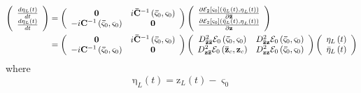 \documentclass[aps,preprint]{revtex4}%
\begin{document}
\begin{align}
\left(
\begin{array}
[c]{c}%
\frac{d\mathrm{\eta}_{L}\left(  t\right)  }{dt}\\
\frac{d\mathrm{\eta}_{L}\left(  t\right)  }{dt}%
\end{array}
\right)   &  =\left(
\begin{array}
[c]{cc}%
\mathbf{0} & i\mathbf{\bar{C}}^{-1}\left(  \mathbf{\bar{\varsigma}}%
_{0},\mathbf{\varsigma}_{0}\right) \\
-i\mathbf{C}^{-1}\left(  \mathbf{\bar{\varsigma}}_{0},\mathbf{\varsigma}%
_{0}\right)  & \mathbf{0}%
\end{array}
\right)  \left(
\begin{array}
[c]{c}%
\frac{\partial\mathcal{E}_{2}\left[  \mathbf{\varsigma}_{0}\right]  \left(
\mathrm{\bar{\eta}}_{L}\left(  t\right)  \mathrm{,\eta}_{L}\left(  t\right)
\right)  }{\partial\mathbf{\bar{z}}}\\
\frac{\partial\mathcal{E}_{2}\left[  \mathbf{\varsigma}_{0}\right]  \left(
\mathrm{\bar{\eta}}_{L}\left(  t\right)  \mathrm{,\eta}_{L}\left(  t\right)
\right)  }{\partial\mathbf{z}}%
\end{array}
\right) \nonumber\\
&  =\left(
\begin{array}
[c]{cc}%
\mathbf{0} & i\mathbf{\bar{C}}^{-1}\left(  \mathbf{\bar{\varsigma}}%
_{0},\mathbf{\varsigma}_{0}\right) \\
-i\mathbf{C}^{-1}\left(  \mathbf{\bar{\varsigma}}_{0},\mathbf{\varsigma}%
_{0}\right)  & \mathbf{0}%
\end{array}
\right)  \left(
\begin{array}
[c]{cc}%
D_{\mathbf{\bar{z}\bar{z}}}^{2}\mathcal{E}_{0}\left(  \mathbf{\bar{\varsigma}%
}_{0},\mathbf{\varsigma}_{0}\right)  & D_{\mathbf{\bar{z}z}}^{2}%
\mathcal{E}_{0}\left(  \mathbf{\bar{\varsigma}}_{0},\mathbf{\varsigma}%
_{0}\right) \\
D_{\mathbf{z\bar{z}}}^{2}\mathcal{E}_{0}\left(  \mathbf{\bar{z}}%
_{c},\mathbf{z}_{c}\right)  & D_{\mathbf{zz}}^{2}\mathcal{E}_{0}\left(
\mathbf{\bar{\varsigma}}_{0},\mathbf{\varsigma}_{0}\right)
\end{array}
\right)  \left(
\begin{array}
[c]{c}%
\mathrm{\eta}_{L}\left(  t\right) \\
\mathrm{\bar{\eta}}_{L}\left(  t\right)
\end{array}
\right)
\end{align}
where
\begin{equation}
\mathrm{\eta}_{L}\left(  t\right)  =\mathrm{z}_{L}\left(  t\right)
-\mathbf{\varsigma}_{0}%
\end{equation}
\end{document}
